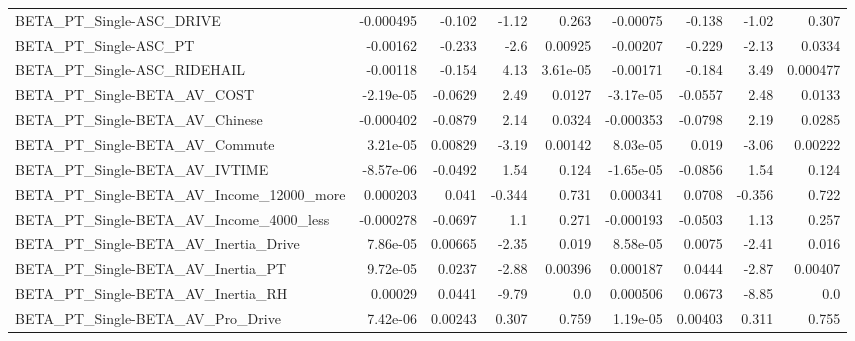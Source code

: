 \begin{tabular}{lrrrrrrrr}
BETA\_PT\_Single-ASC\_DRIVE                           &   -0.000495 &       -0.102 &    -1.12 &    0.263 &   -0.00075 &      -0.138 &        -1.02 &         0.307 \\
BETA\_PT\_Single-ASC\_PT                              &    -0.00162 &       -0.233 &     -2.6 &  0.00925 &   -0.00207 &      -0.229 &        -2.13 &        0.0334 \\
BETA\_PT\_Single-ASC\_RIDEHAIL                        &    -0.00118 &       -0.154 &     4.13 & 3.61e-05 &   -0.00171 &      -0.184 &         3.49 &      0.000477 \\
BETA\_PT\_Single-BETA\_AV\_COST                        &   -2.19e-05 &      -0.0629 &     2.49 &   0.0127 &  -3.17e-05 &     -0.0557 &         2.48 &        0.0133 \\
BETA\_PT\_Single-BETA\_AV\_Chinese                     &   -0.000402 &      -0.0879 &     2.14 &   0.0324 &  -0.000353 &     -0.0798 &         2.19 &        0.0285 \\
BETA\_PT\_Single-BETA\_AV\_Commute                     &    3.21e-05 &      0.00829 &    -3.19 &  0.00142 &   8.03e-05 &       0.019 &        -3.06 &       0.00222 \\
BETA\_PT\_Single-BETA\_AV\_IVTIME                      &   -8.57e-06 &      -0.0492 &     1.54 &    0.124 &  -1.65e-05 &     -0.0856 &         1.54 &         0.124 \\
BETA\_PT\_Single-BETA\_AV\_Income\_12000\_more           &    0.000203 &        0.041 &   -0.344 &    0.731 &   0.000341 &      0.0708 &       -0.356 &         0.722 \\
BETA\_PT\_Single-BETA\_AV\_Income\_4000\_less            &   -0.000278 &      -0.0697 &      1.1 &    0.271 &  -0.000193 &     -0.0503 &         1.13 &         0.257 \\
BETA\_PT\_Single-BETA\_AV\_Inertia\_Drive               &    7.86e-05 &      0.00665 &    -2.35 &    0.019 &   8.58e-05 &      0.0075 &        -2.41 &         0.016 \\
BETA\_PT\_Single-BETA\_AV\_Inertia\_PT                  &    9.72e-05 &       0.0237 &    -2.88 &  0.00396 &   0.000187 &      0.0444 &        -2.87 &       0.00407 \\
BETA\_PT\_Single-BETA\_AV\_Inertia\_RH                  &     0.00029 &       0.0441 &    -9.79 &      0.0 &   0.000506 &      0.0673 &        -8.85 &           0.0 \\
BETA\_PT\_Single-BETA\_AV\_Pro\_Drive                   &    7.42e-06 &      0.00243 &    0.307 &    0.759 &   1.19e-05 &     0.00403 &        0.311 &         0.755 \\

\end{tabular}

